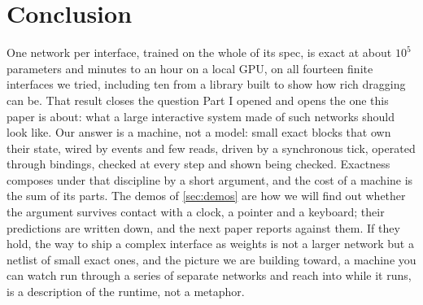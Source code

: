 \section{Conclusion}
\label{sec:conclusion}

One network per interface, trained on the whole of its spec, is exact at about $10^5$ parameters and minutes
to an hour on a local GPU, on all fourteen finite interfaces we tried, including ten from a library built to show how rich dragging can
be. That result closes the question Part I opened and opens the one this paper is about: what a large
interactive system made of such networks should look like. Our answer is a machine, not a model: small exact
blocks that own their state, wired by events and few reads, driven by a synchronous tick, operated through
bindings, checked at every step and shown being checked. Exactness composes under that discipline by a short
argument, and the cost of a machine is the sum of its parts. The demos of \cref{sec:demos} are how we will find
out whether the argument survives contact with a clock, a pointer and a keyboard; their predictions are
written down, and the next paper reports against them. If they hold, the way to ship a complex interface as
weights is not a larger network but a netlist of small exact ones, and the picture we are building toward, a
machine you can watch run through a series of separate networks and reach into while it runs, is a description
of the runtime, not a metaphor.
